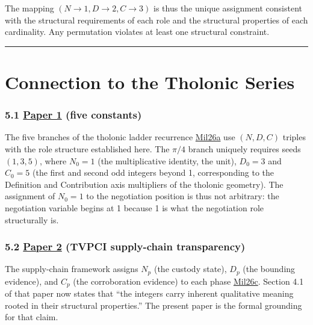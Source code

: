 \documentclass[12pt]{article}
\begin{document}
The mapping \((N \to 1, D \to 2, C \to 3)\) is thus the unique
assignment consistent with the structural requirements of each role and
the structural properties of each cardinality. Any permutation violates
at least one structural constraint.

\begin{center}\rule{0.5\linewidth}{0.5pt}\end{center}

\section{Connection to the Tholonic Series}\label{connection-to-the-tholonic-series}

\subsubsection{\texorpdfstring{5.1
\href{https://github.com/baardev/truevalue/blob/main/docnav/Research/papers/1_recursive-tholonic-five-constants/1_recursive-tholonic-five-constants.pdf}{Paper
1} (five
constants)}{5.1 Paper 1 (five constants)}}\label{paper-1-five-constants}

The five branches of the tholonic ladder recurrence
\href{https://github.com/baardev/truevalue/blob/main/docnav/Research/papers/1_recursive-tholonic-five-constants/1_recursive-tholonic-five-constants.pdf}{Mil26a}
use \((N, D, C)\) triples with the role structure established here. The
\(\pi/4\) branch uniquely requires seeds \((1, 3, 5)\), where
\(N_0 = 1\) (the multiplicative identity, the unit), \(D_0 = 3\) and
\(C_0 = 5\) (the first and second odd integers beyond 1, corresponding
to the Definition and Contribution axis multipliers of the tholonic
geometry). The assignment of \(N_0 = 1\) to the negotiation position is
thus not arbitrary: the negotiation variable begins at 1 because 1 is
what the negotiation role structurally is.

\subsubsection{\texorpdfstring{5.2
\href{https://github.com/baardev/truevalue/blob/main/docnav/Research/papers/2_supply-chain-transparency-tvpci/2_supply-chain-transparency-tvpci.pdf}{Paper
2} (TVPCI supply-chain
transparency)}{5.2 Paper 2 (TVPCI supply-chain transparency)}}\label{paper-2-tvpci-supply-chain-transparency}

The supply-chain framework assigns \(N_p\) (the custody state), \(D_p\)
(the bounding evidence), and \(C_p\) (the corroboration evidence) to
each phase
\href{https://github.com/baardev/truevalue/blob/main/docnav/Research/papers/2_supply-chain-transparency-tvpci/2_supply-chain-transparency-tvpci.pdf}{Mil26c}.
Section 4.1 of that paper now states that ``the integers carry inherent
qualitative meaning rooted in their structural properties.'' The present
paper is the formal grounding for that claim.
\end{document}
